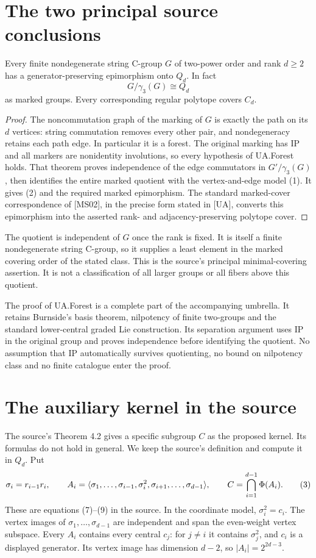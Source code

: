 \section{The two principal source conclusions}
\begin{theorem}
Every finite nondegenerate string C-group $G$ of two-power order and rank
$d\ge2$ has a generator-preserving epimorphism onto $Q_d$. In fact
\[
 G/\gamma_3(G)\cong Q_d                                  \tag{2}
\]
as marked groups. Every corresponding regular polytope covers $C_d$.
\end{theorem}
\begin{proof}
The noncommutation graph of the marking of $G$ is exactly the path on its
$d$ vertices: string commutation removes every other pair, and
nondegeneracy retains each path edge. In particular it is a forest. The
original marking has IP and all markers are nonidentity involutions, so
every hypothesis of UA.Forest holds. That theorem proves independence of
the edge commutators in $G'/\gamma_3(G)$, then identifies the entire
marked quotient with the vertex-and-edge model (1). It gives (2) and the
required marked epimorphism. The standard marked-cover correspondence
of [MS02], in the precise form stated in [UA], converts this epimorphism
into the asserted rank- and adjacency-preserving polytope cover.
\end{proof}

The quotient is independent of $G$ once the rank is fixed. It is itself a
finite nondegenerate string C-group, so it supplies a least element in the
marked covering order of the stated class. This is the source's principal
minimal-covering assertion. It is not a classification of all larger groups
or all fibers above this quotient.

The proof of UA.Forest is a complete part of the accompanying umbrella.
It retains Burnside's basis theorem, nilpotency of finite two-groups and
the standard lower-central graded Lie construction. Its separation argument
uses IP in the original group and proves independence before identifying
the quotient. No assumption that IP automatically survives quotienting,
no bound on nilpotency class and no finite catalogue enter the proof.

\section{The auxiliary kernel in the source}
The source's Theorem 4.2 gives a specific subgroup $C$ as the proposed
kernel. Its formulas do not hold in general. We keep the source's
definition and compute it in $Q_d$.
Put
\[
 \sigma_i=r_{i-1}r_i,\qquad
 A_i=\langle \sigma_1,\ldots,\sigma_{i-1},\sigma_i^2,
                    \sigma_{i+1},\ldots,\sigma_{d-1}\rangle,
 \qquad C=\bigcap_{i=1}^{d-1}\Phi(A_i).                    \tag{3}
\]
These are equations (7)--(9) in the source. In the coordinate model,
$\sigma_i^2=c_i$. The vertex images of $\sigma_1,\ldots,\sigma_{d-1}$
are independent and span the even-weight vertex subspace. Every $A_i$
contains every central $c_j$: for $j\ne i$ it contains $\sigma_j^2$,
and $c_i$ is a displayed generator. Its vertex image has dimension $d-2$,
so $|A_i|=2^{2d-3}$.

